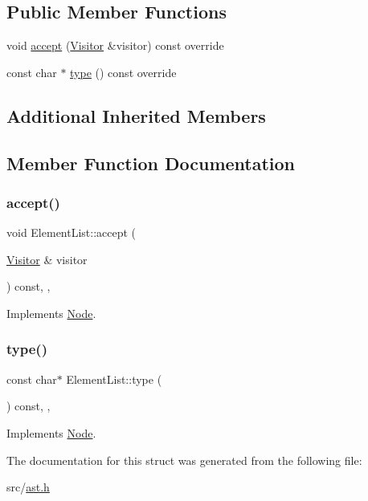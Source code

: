 \subsection*{Public Member Functions}
\begin{DoxyCompactItemize}
\item 
void \hyperlink{struct_element_list_a18e97e7ffed161a8f3f6a631550486fe}{accept} (\hyperlink{struct_visitor}{Visitor} \&visitor) const override
\item 
const char $\ast$ \hyperlink{struct_element_list_ae1da6b963a837e315c28dd017afc06a7}{type} () const override
\end{DoxyCompactItemize}
\subsection*{Additional Inherited Members}


\subsection{Member Function Documentation}
\mbox{\label{struct_element_list_a18e97e7ffed161a8f3f6a631550486fe}} 
\subsubsection{\texorpdfstring{accept()}{accept()}}
{\footnotesize\ttfamily void Element\+List\+::accept (\begin{DoxyParamCaption}\item[{\hyperlink{struct_visitor}{Visitor} \&}]{visitor }\end{DoxyParamCaption}) const\hspace{0.3cm}{\ttfamily [inline]}, {\ttfamily [override]}, {\ttfamily [virtual]}}



Implements \hyperlink{struct_node_a10bd7af968140bbf5fa461298a969c71}{Node}.

\mbox{\label{struct_element_list_ae1da6b963a837e315c28dd017afc06a7}} 
\subsubsection{\texorpdfstring{type()}{type()}}
{\footnotesize\ttfamily const char$\ast$ Element\+List\+::type (\begin{DoxyParamCaption}{ }\end{DoxyParamCaption}) const\hspace{0.3cm}{\ttfamily [inline]}, {\ttfamily [override]}, {\ttfamily [virtual]}}



Implements \hyperlink{struct_node_a82f29420d0a38efcc370352528e94e9b}{Node}.



The documentation for this struct was generated from the following file\+:\begin{DoxyCompactItemize}
\item 
src/\hyperlink{ast_8h}{ast.\+h}\end{DoxyCompactItemize}

